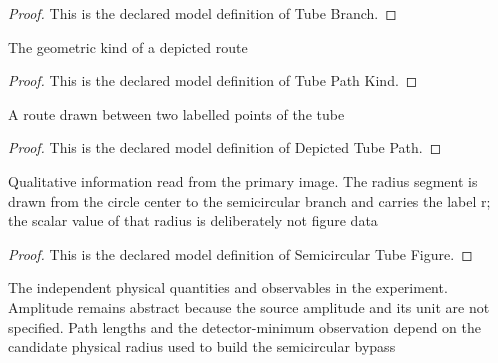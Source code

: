 \begin{proof}
  This is the declared model definition of Tube Branch.
\end{proof}
\begin{definition}
  \label{def:physics:phyx-mini-0315:phyxminiproblems-problemphyxmini0315-tubepathkind}
  The geometric kind of a depicted route
\end{definition}
\begin{proof}
  This is the declared model definition of Tube Path Kind.
\end{proof}
\begin{definition}
  \label{def:physics:phyx-mini-0315:phyxminiproblems-problemphyxmini0315-depictedtubepath}
  A route drawn between two labelled points of the tube
\end{definition}
\begin{proof}
  This is the declared model definition of Depicted Tube Path.
\end{proof}
\begin{definition}
  \label{def:physics:phyx-mini-0315:phyxminiproblems-problemphyxmini0315-semicirculartubefigure}
  Qualitative information read from the primary image. The radius segment is drawn from the circle center to the semicircular branch and carries the label r; the scalar value of that radius is deliberately not figure data
\end{definition}
\begin{proof}
  This is the declared model definition of Semicircular Tube Figure.
\end{proof}
\begin{definition}
  \label{def:physics:phyx-mini-0315:phyxminiproblems-problemphyxmini0315-twopathsoundtubesetup}
  The independent physical quantities and observables in the experiment. Amplitude remains abstract because the source amplitude and its unit are not specified. Path lengths and the detector-minimum observation depend on the candidate physical radius used to build the semicircular bypass
\end{definition}
